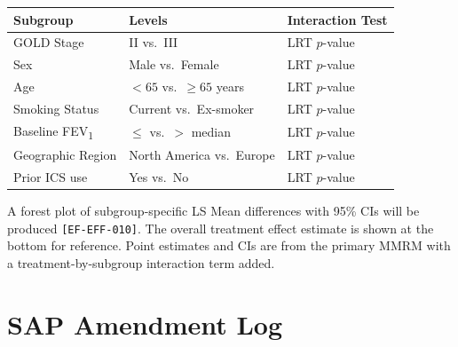\documentclass[11pt,a4paper]{article}
\newcommand{\tflref}[1]{\texttt{\small[#1]}}
\begin{document}
\begin{tabularx}{\linewidth}{@{}
  >{\raggedright\arraybackslash}X
  >{\centering\arraybackslash}p{30mm}
  >{\centering\arraybackslash}p{30mm}@{}}
\toprule
\rowcolor{sapfog}
\textbf{Subgroup} & \textbf{Levels} & \textbf{Interaction Test} \\
\midrule
GOLD Stage              & II vs.\ III                  & LRT $p$-value \\
Sex                     & Male vs.\ Female             & LRT $p$-value \\
Age                     & $<65$ vs.\ $\geq65$ years    & LRT $p$-value \\
Smoking Status          & Current vs.\ Ex-smoker       & LRT $p$-value \\
Baseline FEV\textsubscript{1} & $\leq$ vs.\ $>$ median & LRT $p$-value \\
Geographic Region       & North America vs.\ Europe    & LRT $p$-value \\
Prior ICS use           & Yes vs.\ No                  & LRT $p$-value \\
\bottomrule
\end{tabularx}

\begin{tcolorbox}[sapnote, title={\faIcon{chart-bar}\ Forest Plot}]
  A forest plot of subgroup-specific LS Mean differences with 95\% CIs will be
  produced \tflref{EF-EFF-010}. The overall treatment effect estimate is shown at
  the bottom for reference. Point estimates and CIs are from the primary MMRM
  with a treatment-by-subgroup interaction term added.
\end{tcolorbox}

\clearpage

\section{SAP Amendment Log}
\end{document}
